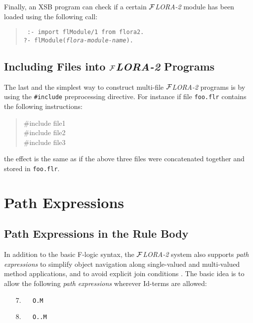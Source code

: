 \documentclass[11pt]{article}
\newcommand{\FLORA}{{\mbox{${\cal F}${\small\it LORA}\rm\emph{-2}}}\xspace}
\newcommand{\fl}{\mbox{F-logic}\xspace}
\begin{document}
Finally, an XSB program can check if a certain \FLORA module has been
loaded using the following call:
\begin{quote}
 \tt
 :- import flModule/1 from flora2.\\
 ?- flModule({\it flora-module-name}).
\end{quote}


\subsection{Including Files into \FLORA Programs}

The last and the simplest way to construct multi-file \FLORA 
programs is by using the {\tt \#include} preprocessing directive.
For instance if file {\tt foo.flr} contains the following instructions:
\begin{quote}
  \#include file1 \\
  \#include file2\\
  \#include file3
\end{quote}
the effect is the same as if the above three files were concatenated
together and stored in {\tt foo.flr}.



\section{Path Expressions}\label{sec-pathexpr}

\subsection{Path Expressions in the Rule Body}


In addition to the basic \fl syntax, the \FLORA  system also supports
\emph{path expressions} to simplify object navigation along
single-valued and multi-valued method applications, and to avoid
explicit join conditions \cite{frohn-lausen-uphoff-VLDB-94}.  The
basic idea is to allow the following \emph{path expressions} wherever
Id-terms are allowed:

  \medskip

\begin{enumerate} 
\item[7.]\label{eq-path-fun} ~~ {\tt O.M}
\item[8.]\label{eq-path-set} ~~ {\tt O..M} 
\end{enumerate} \medskip
\end{document}
